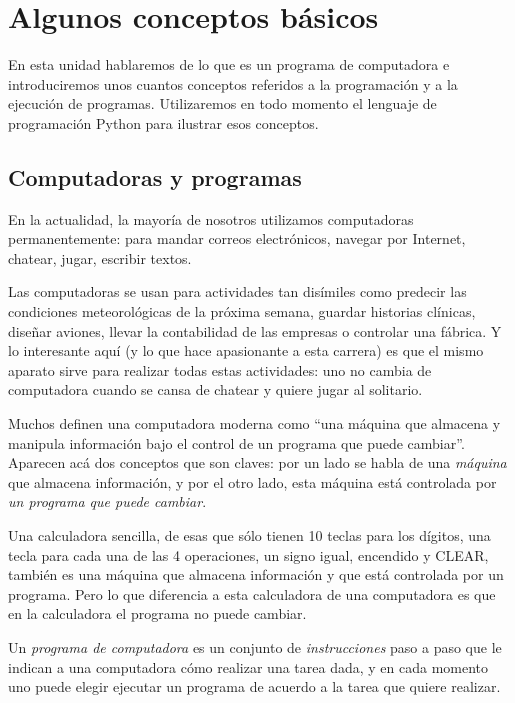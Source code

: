 \chapter[Conceptos básicos]{Algunos conceptos básicos}
\label{chapter:conceptos}

En esta unidad hablaremos de lo que es un programa de
computadora e introduciremos unos cuantos conceptos referidos a la
programación y a la ejecución de programas. Utilizaremos en todo
momento el lenguaje de programación Python para ilustrar esos
conceptos.

\section{Computadoras y programas}

En la actualidad, la mayoría de nosotros utilizamos computadoras
permanentemente: para mandar correos electrónicos, navegar por Internet,
chatear, jugar, escribir textos.

Las computadoras se usan para actividades tan disímiles como predecir las
condiciones meteorológicas de la próxima semana, guardar historias clínicas,
diseñar aviones, llevar la contabilidad de las empresas o controlar una
fábrica. Y lo interesante aquí (y lo que hace apasionante a esta carrera) es
que el mismo aparato sirve para realizar todas estas actividades: uno no
cambia de computadora cuando se cansa de chatear y quiere jugar al solitario.

Muchos definen una computadora moderna como ``una máquina que
almacena y manipula información bajo el control de un programa que
puede cambiar''. Aparecen acá dos conceptos que son claves: por un
lado se habla de una \emph{máquina} que almacena información, y por
el otro lado, esta máquina está controlada por \emph{un programa
que puede cambiar}.

Una calculadora sencilla, de esas que sólo tienen 10 teclas para
los dígitos, una tecla para cada una de las 4 operaciones, un
signo igual, encendido y CLEAR, también es una máquina que
almacena información y que está controlada por un programa. Pero
lo que diferencia a esta calculadora de una computadora es que en
la calculadora el programa no puede cambiar.

Un \emph{programa de computadora} es un conjunto de \emph{instrucciones}
paso a paso que le indican a una computadora cómo
realizar una tarea dada, y en cada momento uno puede elegir
ejecutar un programa de acuerdo a la tarea que quiere realizar.


